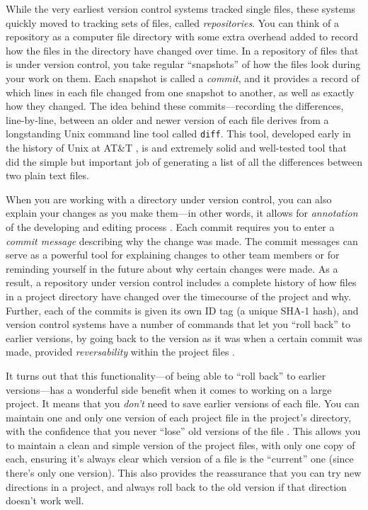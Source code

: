 \documentclass[]{tufte-book}
\begin{document}
While the very earliest version control systems tracked single files, these
systems quickly moved to tracking sets of files, called \emph{repositories}. You can
think of a repository as a computer file directory with some extra overhead
added to record how the files in the directory have changed over time. In a
repository of files that is under version control, you take regular ``snapshots''
of how the files look during your work on them. Each snapshot is called a
\emph{commit}, and it provides a record of which lines in each file changed from one
snapshot to another, as well as exactly how they changed. The idea behind these
commits---recording the differences, line-by-line, between an older and newer
version of each file derives from a longstanding Unix command line tool called
\texttt{diff}. This tool, developed early in the history of Unix at AT\&T
\citep{raymond2003art}, is and extremely solid and well-tested tool that did the
simple but important job of generating a list of all the differences between two
plain text files.

When you are working with a directory under version control, you can also
explain your changes as you make them---in other words, it allows for
\emph{annotation} of the developing and editing process \citep{raymondunderstanding}. Each
commit requires you to enter a \emph{commit message} describing why the change was
made. The commit messages can serve as a powerful tool for explaining changes to
other team members or for reminding yourself in the future about why certain
changes were made. As a result, a repository under version control includes a
complete history of how files in a project directory have changed over the
timecourse of the project and why. Further, each of the commits is given its own
ID tag (a unique SHA-1 hash), and version control systems have a number of
commands that let you ``roll back'' to earlier versions, by going back to the
version as it was when a certain commit was made, provided \emph{reversability}
within the project files \citep{raymondunderstanding}.

It turns out that this functionality---of being able to ``roll back'' to earlier
versions---has a wonderful side benefit when it comes to working on a large
project. It means that you \emph{don't} need to save earlier versions of each file.
You can maintain one and only one version of each project file in the project's
directory, with the confidence that you never ``lose'' old versions of the file
\citep{perkel2018git, blischak2016quick}. This allows you to maintain a clean and
simple version of the project files, with only one copy of each, ensuring it's
always clear which version of a file is the ``current'' one (since there's only
one version). This also provides the reassurance that you can try new directions
in a project, and always roll back to the old version if that direction doesn't
work well.
\end{document}
